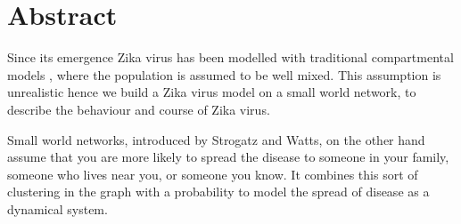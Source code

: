 
\chapter*{Abstract} 
Since its emergence Zika virus has been modelled with traditional compartmental models ,
where the population is assumed to be well mixed.
This assumption is unrealistic hence  we build a Zika virus model on a small world network, to describe the behaviour and course of Zika virus.

Small world networks, introduced by Strogatz and Watts, on the other hand assume that you are more likely to spread the disease to someone in your family, someone who lives near you, or someone you know.
It combines
this sort of clustering in the graph with a probability to model the spread of disease as a dynamical system.





